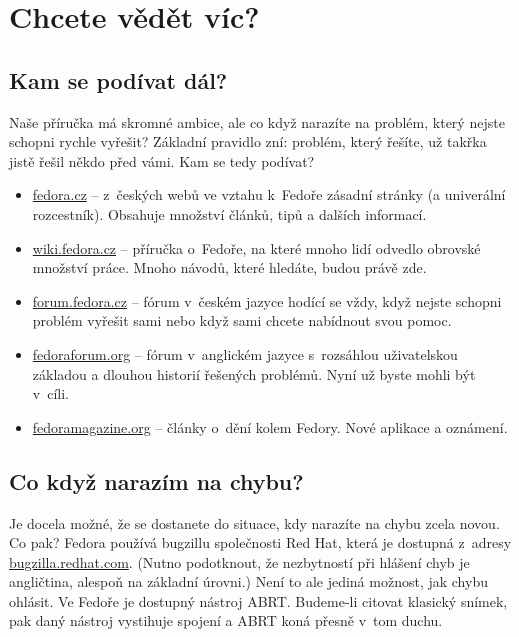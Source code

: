 \chapter*{Chcete vědět víc?}

\section*{Kam se podívat dál?}
Naše příručka má skromné ambice, ale co když narazíte na problém, který nejste schopni rychle vyřešit? Základní pravidlo zní: problém, který řešíte, už takřka jistě řešil někdo před vámi. Kam se tedy podívat?

\begin{itemize}
\item \url{fedora.cz} -- z~českých webů ve vztahu k~Fedoře zásadní stránky (a univerální rozcestník). Obsahuje množství článků, tipů a dalších informací.
\item \url{wiki.fedora.cz} -- příručka o~Fedoře, na které mnoho lidí odvedlo obrovské množství práce. Mnoho návodů, které hledáte, budou právě zde.
\item \url{forum.fedora.cz} -- fórum v~českém jazyce hodící se vždy, když nejste schopni problém vyřešit sami nebo když sami chcete nabídnout svou pomoc.
\item \url{fedoraforum.org} -- fórum v~anglickém jazyce s~rozsáhlou uživatelskou základou a dlouhou historií řešených problémů. Nyní už byste mohli být v~cíli.
\item \url{fedoramagazine.org} -- články o~dění kolem Fedory. Nové aplikace a oznámení.
\end{itemize}

\section*{Co když narazím na chybu?}
Je docela možné, že se dostanete do situace, kdy narazíte na chybu zcela novou. Co pak? Fedora používá bugzillu společnosti Red Hat, která je dostupná z~adresy \url{bugzilla.redhat.com}. (Nutno podotknout, že nezbytností při hlášení chyb je angličtina, alespoň na základní úrovni.) Není to ale jediná možnost, jak chybu ohlásit. Ve Fedoře je dostupný nástroj ABRT. Budeme-li citovat klasický snímek, pak daný nástroj vystihuje spojení \emph{} a ABRT koná přesně v~tom duchu.

